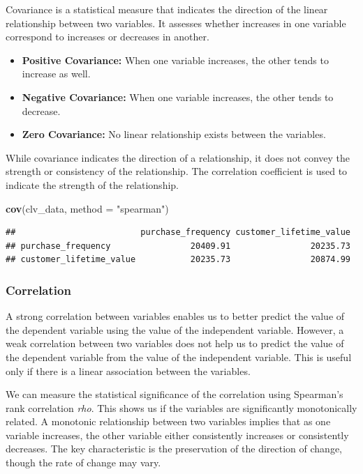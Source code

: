 \documentclass[
]{article}
\newenvironment{Shaded}{\begin{snugshade}}{\end{snugshade}}
\newcommand{\AttributeTok}[1]{\textcolor[rgb]{0.13,0.29,0.53}{#1}}
\newcommand{\FunctionTok}[1]{\textcolor[rgb]{0.13,0.29,0.53}{\textbf{#1}}}
\newcommand{\NormalTok}[1]{#1}
\newcommand{\StringTok}[1]{\textcolor[rgb]{0.31,0.60,0.02}{#1}}
\begin{document}
Covariance is a statistical measure that indicates the direction of the
linear relationship between two variables. It assesses whether increases
in one variable correspond to increases or decreases in
another.\hspace{0pt}

\begin{itemize}
\item
  \textbf{Positive Covariance:} When one variable increases, the other
  tends to increase as well.
\item
  \textbf{Negative Covariance:} When one variable increases, the other
  tends to decrease.
\item
  \textbf{Zero Covariance:} No linear relationship exists between the
  variables.
\end{itemize}

While covariance indicates the direction of a relationship, it does not
convey the strength or consistency of the relationship. The correlation
coefficient is used to indicate the strength of the relationship.

\begin{Shaded}
\begin{Highlighting}[]
\FunctionTok{cov}\NormalTok{(clv\_data, }\AttributeTok{method =} \StringTok{"spearman"}\NormalTok{)}
\end{Highlighting}
\end{Shaded}

\begin{verbatim}
##                         purchase_frequency customer_lifetime_value
## purchase_frequency                20409.91                20235.73
## customer_lifetime_value           20235.73                20874.99
\end{verbatim}

\subsubsection{\texorpdfstring{\textbf{Correlation}}{Correlation}}\label{correlation}

A strong correlation between variables enables us to better predict the
value of the dependent variable using the value of the independent
variable. However, a weak correlation between two variables does not
help us to predict the value of the dependent variable from the value of
the independent variable. This is useful only if there is a linear
association between the variables.

We can measure the statistical significance of the correlation using
Spearman's rank correlation \emph{rho}. This shows us if the variables
are significantly monotonically related. A monotonic relationship
between two variables implies that as one variable increases, the other
variable either consistently increases or consistently decreases. The
key characteristic is the preservation of the direction of change,
though the rate of change may vary.
\end{document}
